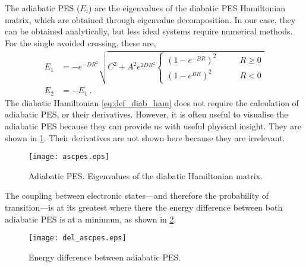 The adiabatic PES ($ E_{i} $) are the eigenvalues of the diabatic PES 
Hamiltonian matrix, which are obtained through eigenvalue decomposition. In our 
case, they can be obtained analytically, but less ideal systems require 
numerical methods. For the single avoided crossing, these are,
\begin{subequations}\label{eq:ascpes}
\begin{align}
E_{1} &= -e^{-D R^{2}}
\sqrt{
C^{2} + A^{2}e^{2 D R^{2}}
\begin{cases}
\left(1 - e^{-B R}\right)^{2} &\qquad R\geq 0\\
\left(1 - e^{B R}\right)^{2} &\qquad R<0
\end{cases}
}\\
E_{2} & = -E_{1}~.
\end{align}
\end{subequations}
The diabatic Hamiltonian \cref{eq:def_diab_ham} does not require the 
calculation of adiabatic PES, or their derivatives. However, it is often useful 
to visualise the adiabatic PES because they can provide us with useful physical 
insight. They are shown in \cref{f:apessc}. Their derivatives are not shown here because they are irrelevant.

\begin{figure}
\centering
\texttt{[image: ascpes.eps]}
\caption[Single avoided crossing: adiabatic PES.]{Adiabatic PES. Eigenvalues of the diabatic Hamiltonian matrix.}
\label{f:apessc}
\end{figure}

The coupling between electronic states---and therefore the probability of transition---is at its greatest where there the energy difference between both adiabatic PES is at a minimum, as shown in \cref{f:delapessc}.

\begin{figure}
\centering
\texttt{[image: del\_ascpes.eps]}
\caption[Single avoided crossing: energy difference between adiabatic PES.]{Energy difference between adiabatic PES.}
\label{f:delapessc}
\end{figure}
%
